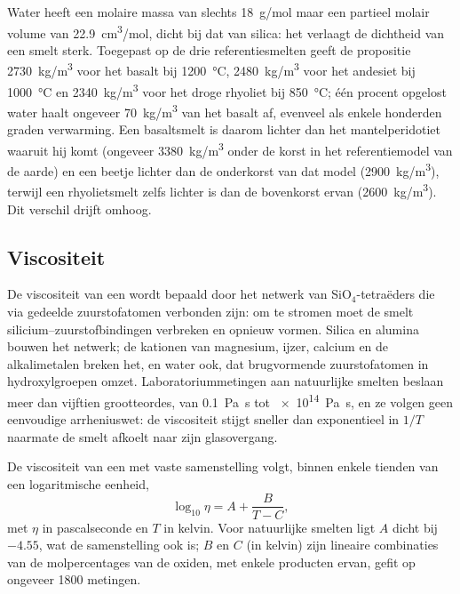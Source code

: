 Water heeft een molaire massa van slechts \qty{18}{g/mol} maar een partieel molair volume van
\qty{22.9}{cm^3/mol}, dicht bij dat van silica: het verlaagt de dichtheid van een smelt
sterk. Toegepast op de drie referentiesmelten geeft de propositie
\qty{2730}{kg/m^3} voor het basalt bij \qty{1200}{\celsius}, \qty{2480}{kg/m^3} voor
het andesiet bij \qty{1000}{\celsius} en \qty{2340}{kg/m^3} voor het droge rhyoliet
bij \qty{850}{\celsius}; één procent opgelost water haalt ongeveer
\qty{70}{kg/m^3} van het basalt af, evenveel als enkele honderden graden verwarming.
Een basaltsmelt is daarom lichter dan het mantelperidotiet waaruit hij komt
(ongeveer \qty{3380}{kg/m^3} onder de korst in het referentiemodel van de aarde) en een
beetje lichter dan de onderkorst van dat model (\qty{2900}{kg/m^3}), terwijl een
rhyolietsmelt zelfs lichter is dan de bovenkorst ervan (\qty{2600}{kg/m^3}). Dit verschil drijft 
omhoog.

\subsection{Viscositeit}

De viscositeit van een  wordt bepaald door het netwerk van SiO$_4$-tetraëders
die via gedeelde zuurstofatomen verbonden zijn: om te stromen moet de smelt
silicium--zuurstofbindingen verbreken en opnieuw vormen. Silica en alumina bouwen het netwerk; de kationen van
magnesium, ijzer, calcium en de alkalimetalen breken het, en water ook, dat
brugvormende zuurstofatomen in hydroxylgroepen omzet. Laboratoriummetingen aan natuurlijke
smelten beslaan meer dan vijftien grootteordes, van \qty{0.1}{Pa.s} tot
\qty{e14}{Pa.s}, en ze volgen geen eenvoudige arrheniuswet: de viscositeit
stijgt sneller dan exponentieel in $1/T$ naarmate de smelt afkoelt naar zijn
glasovergang.

\begin{proposition}\label{prop:b2:magma-emplacement:vft}
De viscositeit van een  met vaste samenstelling volgt, binnen enkele
tienden van een logaritmische eenheid,
\[
\log_{10}\eta = A + \frac{B}{T - C},
\]
met $\eta$ in pascalseconde en $T$ in kelvin. Voor natuurlijke smelten ligt $A$ dicht
bij $-4.55$, wat de samenstelling ook is; $B$ en $C$ (in kelvin) zijn lineaire
combinaties van de molpercentages van de oxiden, met enkele producten ervan,
gefit op ongeveer \num{1800} metingen.
\end{proposition}
\admitted


